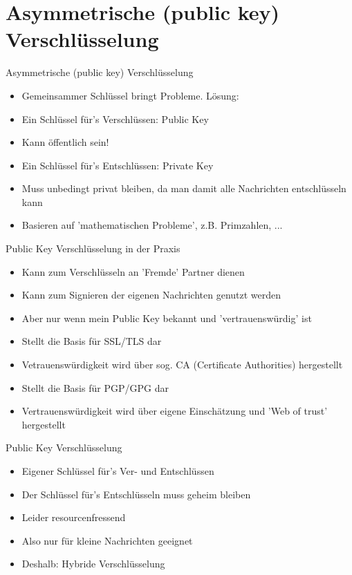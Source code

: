 \section{Asymmetrische (public key) Verschlüsselung}
  \begin{frame}{Asymmetrische (public key) Verschlüsselung}
    \begin{itemize}
      \item{Gemeinsammer Schlüssel bringt Probleme. Lösung:}
      \item{Ein Schlüssel für's Verschlüssen: Public Key}
      \item{Kann öffentlich sein!}
      \item{Ein Schlüssel für's Entschlüssen: Private Key}
      \item{Muss unbedingt privat bleiben, da man damit alle Nachrichten entschlüsseln kann}
      \item{Basieren auf 'mathematischen Probleme', z.B. Primzahlen, ...}
    \end{itemize}
  \end{frame}
  \begin{frame}{Public Key Verschlüsselung in der Praxis}
    \begin{itemize}
      \item{Kann zum Verschlüsseln an 'Fremde' Partner dienen}
      \item{Kann zum Signieren der eigenen Nachrichten genutzt werden}
      \item{Aber nur wenn mein Public Key bekannt und 'vertrauenswürdig' ist}
      \item{Stellt die Basis für SSL/TLS dar}
      \item{Vetrauenswürdigkeit wird über sog. CA (Certificate Authorities) hergestellt}
      \item{Stellt die Basis für PGP/GPG dar}
      \item{Vertrauenswürdigkeit wird über eigene Einschätzung und 'Web of trust' hergestellt}
    \end{itemize}
  \end{frame}
  \begin{frame}{Public Key Verschlüsselung}
    \begin{itemize}
      \item{Eigener Schlüssel für's Ver- und Entschlüssen}
      \item{Der Schlüssel für's Entschlüsseln muss geheim bleiben}
      \item{Leider resourcenfressend}
      \item{Also nur für kleine Nachrichten geeignet}
      \item{Deshalb: Hybride Verschlüsselung}
    \end{itemize}
  \end{frame}
